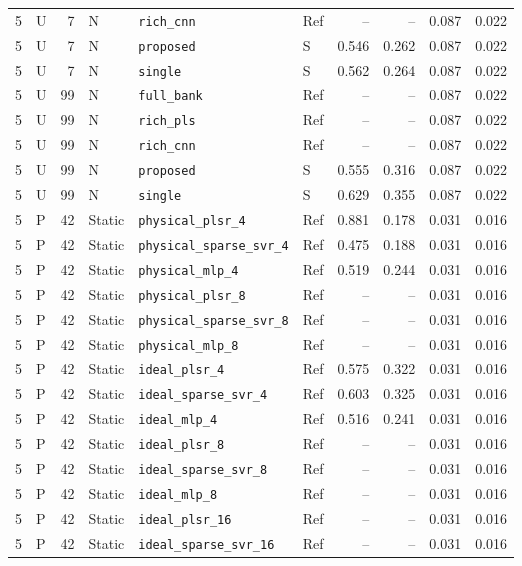 \documentclass[10pt,a4paper]{article}
\begin{document}
\begin{landscape}
\begin{longtable}{rlrlllrrrr}
5 & U & 7 & N & \texttt{rich\_cnn} & Ref & -- & -- & 0.087 & 0.022 \\
5 & U & 7 & N & \texttt{proposed} & S & 0.546 & 0.262 & 0.087 & 0.022 \\
5 & U & 7 & N & \texttt{single} & S & 0.562 & 0.264 & 0.087 & 0.022 \\
5 & U & 99 & N & \texttt{full\_bank} & Ref & -- & -- & 0.087 & 0.022 \\
5 & U & 99 & N & \texttt{rich\_pls} & Ref & -- & -- & 0.087 & 0.022 \\
5 & U & 99 & N & \texttt{rich\_cnn} & Ref & -- & -- & 0.087 & 0.022 \\
5 & U & 99 & N & \texttt{proposed} & S & 0.555 & 0.316 & 0.087 & 0.022 \\
5 & U & 99 & N & \texttt{single} & S & 0.629 & 0.355 & 0.087 & 0.022 \\
5 & P & 42 & Static & \texttt{physical\_plsr\_4} & Ref & 0.881 & 0.178 & 0.031 & 0.016 \\
5 & P & 42 & Static & \texttt{physical\_sparse\_svr\_4} & Ref & 0.475 & 0.188 & 0.031 & 0.016 \\
5 & P & 42 & Static & \texttt{physical\_mlp\_4} & Ref & 0.519 & 0.244 & 0.031 & 0.016 \\
5 & P & 42 & Static & \texttt{physical\_plsr\_8} & Ref & -- & -- & 0.031 & 0.016 \\
5 & P & 42 & Static & \texttt{physical\_sparse\_svr\_8} & Ref & -- & -- & 0.031 & 0.016 \\
5 & P & 42 & Static & \texttt{physical\_mlp\_8} & Ref & -- & -- & 0.031 & 0.016 \\
5 & P & 42 & Static & \texttt{ideal\_plsr\_4} & Ref & 0.575 & 0.322 & 0.031 & 0.016 \\
5 & P & 42 & Static & \texttt{ideal\_sparse\_svr\_4} & Ref & 0.603 & 0.325 & 0.031 & 0.016 \\
5 & P & 42 & Static & \texttt{ideal\_mlp\_4} & Ref & 0.516 & 0.241 & 0.031 & 0.016 \\
5 & P & 42 & Static & \texttt{ideal\_plsr\_8} & Ref & -- & -- & 0.031 & 0.016 \\
5 & P & 42 & Static & \texttt{ideal\_sparse\_svr\_8} & Ref & -- & -- & 0.031 & 0.016 \\
5 & P & 42 & Static & \texttt{ideal\_mlp\_8} & Ref & -- & -- & 0.031 & 0.016 \\
5 & P & 42 & Static & \texttt{ideal\_plsr\_16} & Ref & -- & -- & 0.031 & 0.016 \\
5 & P & 42 & Static & \texttt{ideal\_sparse\_svr\_16} & Ref & -- & -- & 0.031 & 0.016 \\

\end{longtable}
\end{landscape}
\end{document}
